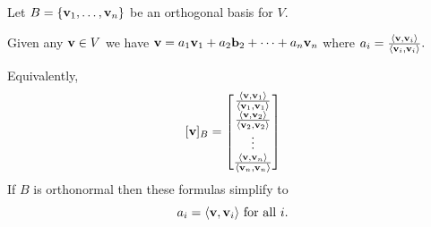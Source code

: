 \begin{frame}
\begin{theorem}
Let $B=\{{\mathbf v}_1,\dots,{\mathbf v}_n\}$ be an \alert{orthogonal basis} for $V$. 

Given any ${\mathbf v}\in V$ we have ${\mathbf v}=a_1{\mathbf v}_1+a_2{\mathbf b}_2+\cdots +a_n{\mathbf v}_n$ where 
$
a_i=\frac{\langle {\mathbf v},{\mathbf v}_i\rangle}{\langle{\mathbf v}_i,{\mathbf v}_i\rangle}.
$
 
\pause Equivalently, 
\[
[{\mathbf v}]_B=\begin{bmatrix}
\frac{\langle {\mathbf v},{\mathbf v}_1\rangle}{\langle{\mathbf v}_1,{\mathbf v}_1\rangle}\\
\frac{\langle {\mathbf v},{\mathbf v}_2\rangle}{\langle{\mathbf v}_2,{\mathbf v}_2\rangle}\\
\vdots \\
\frac{\langle {\mathbf v},{\mathbf v}_n\rangle}{\langle{\mathbf v}_n,{\mathbf v}_n\rangle}
\end{bmatrix}
\]
\pause If $B$ is ortho\alert{normal} then these formulas simplify to 
\[
a_i=\langle{\mathbf v},{\mathbf v}_i\rangle \text{ for all $i$}.
\] 
\end{theorem}
\end{frame}

